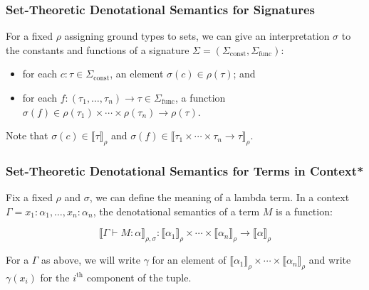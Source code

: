 \documentclass[aspectratio=169]{beamer}
\begin{document}
\begin{frame}
\frametitle{Set-Theoretic Denotational Semantics for Signatures}

For a fixed $\rho$ assigning ground types to sets, we can give an interpretation $\sigma$  to the constants and functions of a signature $\Sigma = (\Sigma_{\text{const}}, \Sigma_{\text{func}})$:
\begin{itemize}
    \item for each $c : \tau \in \Sigma_{\text{const}}$, an element $\sigma(c) \in \rho(\tau)$; and
    \item for each $f : (\tau_1, \ldots, \tau_n) \to \tau \in \Sigma_{\text{func}}$, a function $\sigma(f) \in \rho(\tau_1) \times \!\cdots\! \times \rho(\tau_n) \to \rho(\tau)$.
\end{itemize}
Note that $\sigma(c) \in \llbracket \tau \rrbracket_{\rho}$ and $\sigma(f) \in \llbracket \tau_1 \times \cdots \times \tau_n \rightarrow \tau \rrbracket_{\rho}$.
\end{frame}

\begin{frame}
\frametitle{Set-Theoretic Denotational Semantics for Terms in Context*}

Fix a fixed $\rho$ and $\sigma$, we can define the meaning of a lambda term.
In a context $\Gamma = x_1 : \alpha_1, \ldots, x_n : \alpha_n$, the denotational semantics of a term $M$ is a function:

\[
\llbracket \Gamma \vdash M : \alpha \rrbracket_{\rho, \sigma} : \llbracket \alpha_1 \rrbracket_\rho \times \cdots \times \llbracket \alpha_n \rrbracket_\rho \to \llbracket \alpha \rrbracket_\rho
\]

For a $\Gamma$ as above, we will write $\gamma$ for an element of $\llbracket \alpha_1 \rrbracket_\rho \times \cdots \times \llbracket \alpha_n \rrbracket_\rho$ and write $\gamma(x_i)$ for the $i^{\text{th}}$ component of the tuple.
\end{frame}
\end{document}
